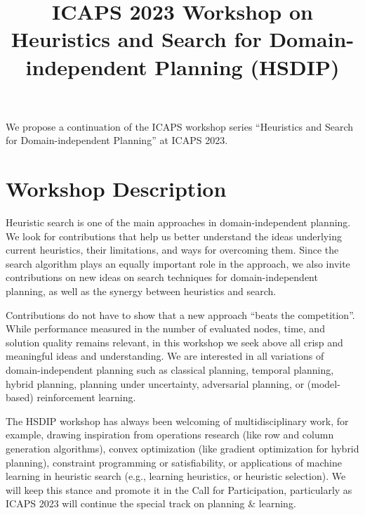 \documentclass[10pt]{article}
\begin{document}
\title{ICAPS 2023 Workshop on Heuristics and Search for Domain-independent
Planning (HSDIP)%
}
\date{}

\author{}

\maketitle

\vspace{-2cm}


We propose a continuation of the ICAPS workshop series ``Heuristics
and Search for Domain-independent Planning'' at ICAPS 2023.

\section*{Workshop Description}
Heuristic search is one of the main approaches in domain-independent
planning.  We look for contributions that help us better
understand the ideas underlying current heuristics, their limitations,
and ways for overcoming them.
%
Since the search algorithm plays an equally important role in the
approach, we also invite contributions on new ideas on search
techniques for domain-independent planning, as well as the synergy
between heuristics and search.

Contributions do not have to show that a new approach ``beats the competition''.
While performance measured in the number of evaluated nodes, time, and solution
quality remains relevant, in this workshop we seek above all crisp and
meaningful ideas and understanding.
%
We are interested in all variations of domain-independent planning
such as classical planning, temporal planning, hybrid planning, planning under
uncertainty, adversarial planning, or (model-based) reinforcement learning.

The HSDIP workshop has always been welcoming of multidisciplinary work,
for example, drawing inspiration from operations research (like row and
column generation algorithms), convex optimization (like gradient
optimization for hybrid planning), constraint programming or
satisfiability, or applications of machine learning in heuristic search
(e.g., learning heuristics, or heuristic selection). We will keep this
stance and promote it in the Call for Participation, particularly as ICAPS 2023
will continue the special track on planning \& learning.
\end{document}
